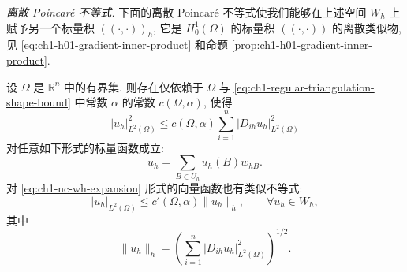 \emph{离散 Poincaré 不等式.} 下面的离散 Poincaré 不等式使我们能够在上述空间 $W_h$ 上赋予另一个标量积 $((\cdot,\cdot))_h$, 它是 $H_0^1(\Omega)$ 的标量积 $((\cdot,\cdot))$ 的离散类似物, 见 \eqref{eq:ch1-h01-gradient-inner-product} 和命题 \ref{prop:ch1-h01-gradient-inner-product}.

\begin{Proposition}
\label{prop:ch1-nc-discrete-poincare}
设 $\Omega$ 是 $\mathbb R^n$ 中的有界集. 则存在仅依赖于 $\Omega$ 与 \eqref{eq:ch1-regular-triangulation-shape-bound} 中常数 $\alpha$ 的常数 $c(\Omega,\alpha)$, 使得
\begin{equation}
|u_h|_{L^2(\Omega)}^2
\leq c(\Omega,\alpha)\sum_{i=1}^n|D_{ih}u_h|_{L^2(\Omega)}^2
\label{eq:ch1-nc-discrete-poincare-scalar}
\end{equation}
对任意如下形式的标量函数成立:
\begin{equation}
u_h=\sum_{B\in U_h}u_h(B)w_{hB}.
\label{eq:ch1-nc-scalar-expansion-repeat}
\end{equation}
对 \eqref{eq:ch1-nc-wh-expansion} 形式的向量函数也有类似不等式:
\begin{equation}
|u_h|_{L^2(\Omega)}\leq c'(\Omega,\alpha)\|u_h\|_h,
\qquad\forall u_h\in W_h,
\label{eq:ch1-nc-discrete-poincare-vector}
\end{equation}
其中
\begin{equation}
\|u_h\|_h=
\left(\sum_{i=1}^n|D_{ih}u_h|_{L^2(\Omega)}^2\right)^{1/2}.
\label{eq:ch1-nc-broken-gradient-norm}
\end{equation}
\end{Proposition}

